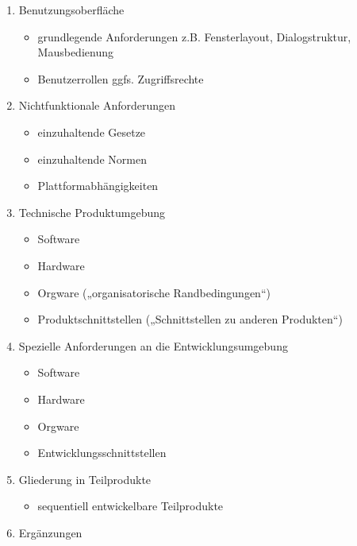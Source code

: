 \documentclass{lehramt-informatik}
\begin{document}
\begin{enumerate}
\item Benutzungsoberfläche

\begin{itemize}
\item grundlegende Anforderungen z.B. Fensterlayout, Dialogstruktur, Mausbedienung
\item Benutzerrollen ggfs. Zugriffsrechte
\end{itemize}

\item Nichtfunktionale Anforderungen

\begin{itemize}
\item einzuhaltende Gesetze
\item einzuhaltende Normen
\item Plattformabhängigkeiten
\end{itemize}

\item Technische Produktumgebung

\begin{itemize}
\item Software
\item Hardware
\item Orgware („organisatorische Randbedingungen“)
\item Produktschnittstellen („Schnittstellen zu anderen Produkten“)
\end{itemize}

\item Spezielle Anforderungen an die Entwicklungsumgebung

\begin{itemize}
\item Software
\item Hardware
\item Orgware
\item Entwicklungsschnittstellen
\end{itemize}

\item Gliederung in Teilprodukte

\begin{itemize}
\item sequentiell entwickelbare Teilprodukte
\end{itemize}

\item Ergänzungen
\end{enumerate}

%
\end{document}
